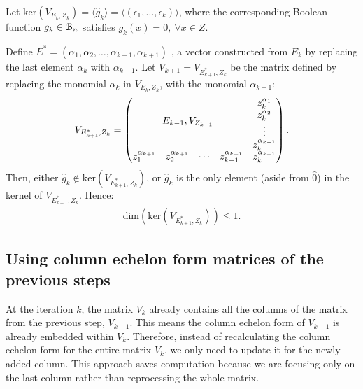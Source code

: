 \documentclass[11pt]{llncs}
\begin{document}
\begin{proposition}\label{prop:constructionOfNextVRemovingAlphai}
    Let $\text{ker}(V_{E_k, Z_k}) =  \langle \hat{g}_k \rangle = \langle (\epsilon_1, \dots, \epsilon_k) \rangle$, where the corresponding Boolean function $g_k\in \mathcal{B}_{n}$ satisfies $g_k(x) = 0,\ \forall x\in Z$.
    
    Define $E^{*} = (\alpha_1, \alpha_2, \dots, \alpha_{k-1}, \alpha_{k+1})$ , a vector constructed from $E_k$ by replacing the last element $\alpha_{k}$ with $\alpha_{k+1}$. 
    Let $V_{k+1} = V_{E^{*}_{k+1}, Z_k}$ be the matrix defined by replacing the monomial $\alpha_k$ in $V_{E_k, Z_k}$, with the monomial $\alpha_{k+1}$: 
    \begin{align*}
        V_{E^{*}_{k+1}, Z_{k}} = 
        \begin{pmatrix}
        \multicolumn{4}{c}{\multirow{4}{*}{$E_{k-1}, V_{Z_{k-1}}$}} & z_{k}^{\alpha_{1}}\\
        & & & & z_{k}^{\alpha_{2}}\\
        & & & & \vdots\\
        & & & & z_{k}^{\alpha_{k-1}}\\
        z_{1}^{\alpha_{k+1}} & z_{2}^{\alpha_{k+1}}& \cdots & z_{k-1}^{\alpha_{k+1}} & z_{k}^{\alpha_{k+1}}
    \end{pmatrix}.
    \end{align*}
    Then, either $\hat{g}_k \not\in \text{ker}(V_{E^{*}_{k+1}, Z_k})$, or $\hat{g}_k$ is the only element (aside from $\hat{0}$) in the kernel of $V_{E_{k+1}^{*}, Z_k}$. Hence:
    \begin{align*}
        \text{dim}\left(\text{ker}(V_{E^{*}_{k+1}, Z_k})\right)\leq 1. 
    \end{align*}

\end{proposition}


\subsection{Using column echelon form matrices of the previous steps}\label{subsubsection:optEchelonForm}

At the iteration \(k\), the matrix  \(V_k\) already contains all the columns of the matrix from the previous step, \(V_{k-1}\). This means the column echelon form of \(V_{k-1}\) is already embedded within \(V_{k}\). Therefore, instead of recalculating the column echelon form for the entire matrix \(V_{k}\), we only need to update it for the newly added column. This approach saves computation because we are focusing only on the last column rather than reprocessing the whole matrix.
\end{document}
